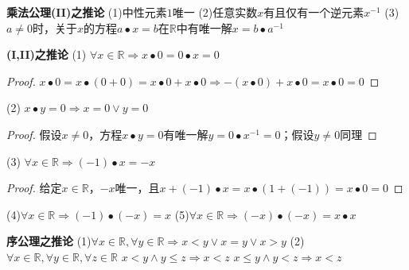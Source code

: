 \documentclass[11pt]{article}
\begin{document}
\textbf{乘法公理(II)之推论} \newline
(1)中性元素$1$唯一 \newline
(2)任意实数$x$有且仅有一个逆元素$x^{-1}$ \newline
(3)$a \not = 0$时，关于$x$的方程$a \bullet x=b$在$\mathbb{R}$中有唯一解$x=b\bullet a^{-1}$ \newline

\textbf{(I,II)之推论} \newline
(1) $\forall x \in \mathbb{R} \Rightarrow x \bullet 0 = 0 \bullet x = 0$ \newline
\begin{proof}
  $x \bullet 0=x \bullet (0+0) = x \bullet 0+x \bullet 0 \Rightarrow -(x \bullet 0)+x \bullet 0 = x \bullet 0 = 0$
\end{proof}
(2) $x \bullet y=0 \Rightarrow x=0 \lor y=0$ \newline
\begin{proof}
  假设$x\not =0$，方程$x\bullet y=0$有唯一解$y=0\bullet x^{-1}=0$；假设$y\not =0$同理
\end{proof}
(3) $\forall x \in \mathbb{R} \Rightarrow (-1) \bullet x=-x$ \newline
\begin{proof}
  给定$x \in \mathbb{R}$，$-x$唯一，且$x+(-1)\bullet x=x\bullet(1+(-1))=x\bullet 0=0$
\end{proof}
(4)$\forall x \in \mathbb{R} \Rightarrow (-1)\bullet(-x)=x$ \newline
(5)$\forall x \in \mathbb{R} \Rightarrow (-x) \bullet (-x)=x\bullet x$ \newline

\textbf{序公理之推论} \newline
(1)$\forall x \in \mathbb{R}, \forall y \in \mathbb{R} \Rightarrow x<y \lor x=y \lor x>y$ \newline
(2)$\forall x \in \mathbb{R}, \forall y \in \mathbb{R}, \forall z \in \mathbb{R}$ \newline
$x<y \land y \le z \Rightarrow x<z$ \newline
$x \le y \land y<z \Rightarrow x<z$ \newline
\end{document}
